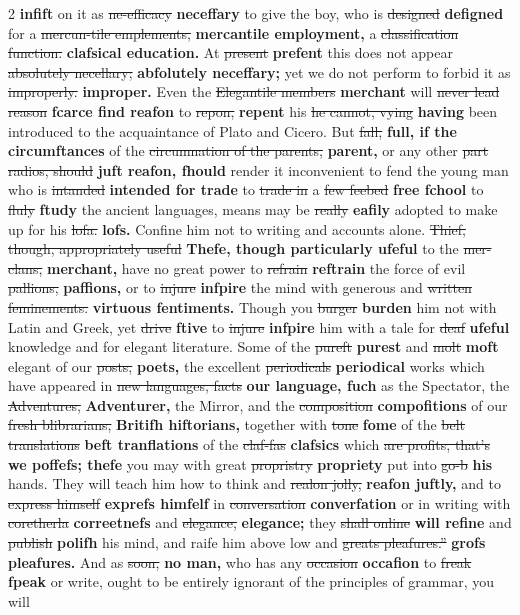 \documentclass[10pt]{article}
\begin{document}
\begin{multicols}{2}
\textbf{infift} on it as \sout{ne-efficacy} \textbf{neceffary} to give the boy, who is \sout{designed} \textbf{defigned} for a \sout{mercun-tile emplements,} \textbf{mercantile employment,} a \sout{classification function.} \textbf{clafsical education.} At \sout{present} \textbf{prefent} this does not appear \sout{absolutely necellary;} \textbf{abfolutely neceffary;} yet we do not perform to forbid it as \sout{improperly.} \textbf{improper.} Even the \sout{Elegantile members} \textbf{merchant} will \sout{never lead reason} \textbf{fcarce find reafon} to \sout{repon,} \textbf{repent} his \sout{he cannot, vying} \textbf{having} been introduced to the acquaintance of Plato and Cicero. But \sout{fall,} \textbf{full, if the circumftances} of the \sout{circumnation of the parents,} \textbf{parent,} or any other \sout{part radios, should} \textbf{juft reafon, fhould} render it inconvenient to fend the young man who is \sout{intanded} \textbf{intended for trade} to \sout{trade in} a \sout{few feebed} \textbf{free fchool} to \sout{fluly} \textbf{ftudy} the ancient languages, means may be \sout{really} \textbf{eafily} adopted to make up for his \sout{lofa.} \textbf{lofs.} Confine him not to writing and accounts alone. \sout{Thief, though, appropriately useful} \textbf{Thefe, though particularly ufeful} to the \sout{mer-clans,} \textbf{merchant,} have no great power to \sout{refrain} \textbf{reftrain} the force of evil \sout{pallions,} \textbf{paffions,} or to \sout{injure} \textbf{infpire} the mind with generous and \sout{written feminements.} \textbf{virtuous fentiments.} Though you \sout{burger} \textbf{burden} him not with Latin and Greek, yet \sout{drive} \textbf{ftive} to \sout{injure} \textbf{infpire} him with a tale for \sout{deaf} \textbf{ufeful} knowledge and for elegant literature. Some of the \sout{pureft} \textbf{purest} and \sout{molt} \textbf{moft} elegant of our \sout{posts,} \textbf{poets,} the excellent \sout{periodicals} \textbf{periodical} works which have appeared in \sout{new languages, facts} \textbf{our language, fuch} as the Spectator, the \sout{Adventures,} \textbf{Adventurer,} the Mirror, and the \sout{composition} \textbf{compofitions} of our \sout{fresh blibrarians,} \textbf{Britifh hiftorians,} together with \sout{tone} \textbf{fome} of the \sout{belt translations} \textbf{beft tranflations} of the \sout{claf-fas} \textbf{clafsics} which \sout{are profits, that’s} \textbf{we poffefs; thefe} you may with great \sout{propristry} \textbf{propriety} put into \sout{go-b} \textbf{his} hands. They will teach him how to think and \sout{realon jolly,} \textbf{reafon juftly,} and to \sout{express himself} \textbf{exprefs himfelf} in \sout{conversation} \textbf{converfation} or in writing with \sout{coretherla} \textbf{correetnefs} and \sout{elegance,} \textbf{elegance;} they \sout{shall online} \textbf{will refine} and \sout{publish} \textbf{polifh} his mind, and raife him above low and \sout{greats pleafures.”} \textbf{grofs pleafures.} And as \sout{soon,} \textbf{no man,} who has any \sout{occasion} \textbf{occafion} to \sout{freak} \textbf{fpeak} or write, ought to be entirely ignorant of the principles of grammar, you will
\end{multicols}
\end{document}
